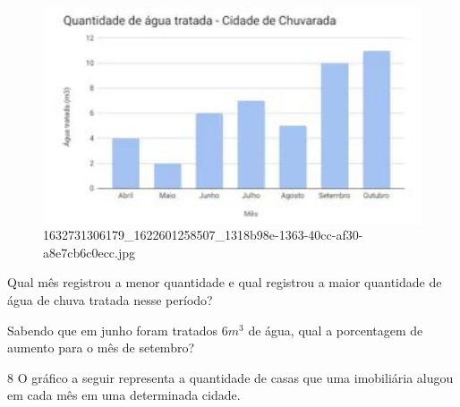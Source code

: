 \begin{escolha}
\begin{escolha}
\begin{escolha}
\begin{escolha}
{\begin{boxmedio}
\begin{boxpeq}
\begin{q°}
\begin{boxmedio}
\begin{boxpeq}
\begin{boxpeq}
\begin{boxmedio}
\begin{boxmedio}
\begin{boxmedio}
\begin{largebox}
\begin{boxmedio}
\begin{figure}
\centering
\includegraphics[width=4.95586in,height=2.50694in]{./_SAEB_9_MAT/media/image216.jpg}
\caption{1632731306179\_1622601258507\_1318b98e-1363-40cc-af30-a8e7cb6c0ecc.jpg}
\end{figure}


\begin{escolha}

  \item Qual mês registrou a menor quantidade e qual registrou a maior
  quantidade de água de chuva tratada nesse período?



  \item Sabendo que em junho foram tratados $6m^3$ de água, qual a porcentagem
  de aumento para o mês de setembro?



\end{escolha}

\num{8} O gráfico a seguir representa a quantidade de casas que uma
imobiliária alugou em cada mês em uma determinada cidade.


\end{boxmedio}
\end{largebox}
\end{boxmedio}
\end{boxmedio}
\end{boxmedio}
\end{boxpeq}
\end{boxpeq}
\end{boxmedio}
\end{q°}
\end{boxpeq}
\end{boxmedio}}
\end{escolha}
\end{escolha}
\end{escolha}
\end{escolha}

